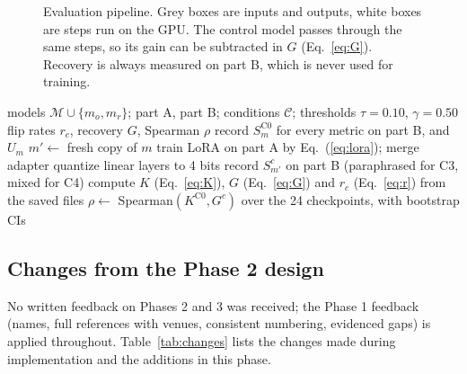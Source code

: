 \documentclass[conference]{IEEEtran}
\begin{document}
\begin{figure}[t]
\caption{Evaluation pipeline. Grey boxes are inputs and outputs, white boxes are steps run on the GPU. The control model passes through the same steps, so its gain can be subtracted in $G$ (Eq.~\ref{eq:G}). Recovery is always measured on part B, which is never used for training.}
\label{fig:pipeline}
\end{figure}

\begin{algorithm}[t]
\caption{Paired, control-adjusted recovery test}
\label{alg:protocol}
\begin{algorithmic}[1]
\REQUIRE models $\mathcal{M}\cup\{m_o,m_r\}$; part A, part B; conditions $\mathcal{C}$; thresholds $\tau=0.10$, $\gamma=0.50$
\ENSURE flip rates $r_c$, recovery $G$, Spearman $\rho$
  \STATE record $S_m^{\mathrm{C0}}$ for every metric on part B, and $U_m$
    \STATE $m'\leftarrow$ fresh copy of $m$
     \STATE train LoRA on part A by Eq.~(\ref{eq:lora}); merge adapter \ENDIF
     \STATE quantize linear layers to 4 bits \ENDIF
    \STATE record $S_{m'}^{c}$ on part B (paraphrased for C3, mixed for C4)
  \ENDFOR
\ENDFOR
\STATE compute $K$ (Eq.~\ref{eq:K}), $G$ (Eq.~\ref{eq:G}) and $r_c$ (Eq.~\ref{eq:r}) from the saved files
\STATE $\rho\leftarrow$ Spearman$(K^{\mathrm{C0}},G^{c})$ over the 24 checkpoints, with bootstrap CIs
\end{algorithmic}
\end{algorithm}

\subsection{Changes from the Phase 2 design}
No written feedback on Phases 2 and 3 was received; the Phase 1 feedback (names, full references with venues, consistent numbering, evidenced gaps) is applied throughout. Table~\ref{tab:changes} lists the changes made during implementation and the additions in this phase.
\end{document}
